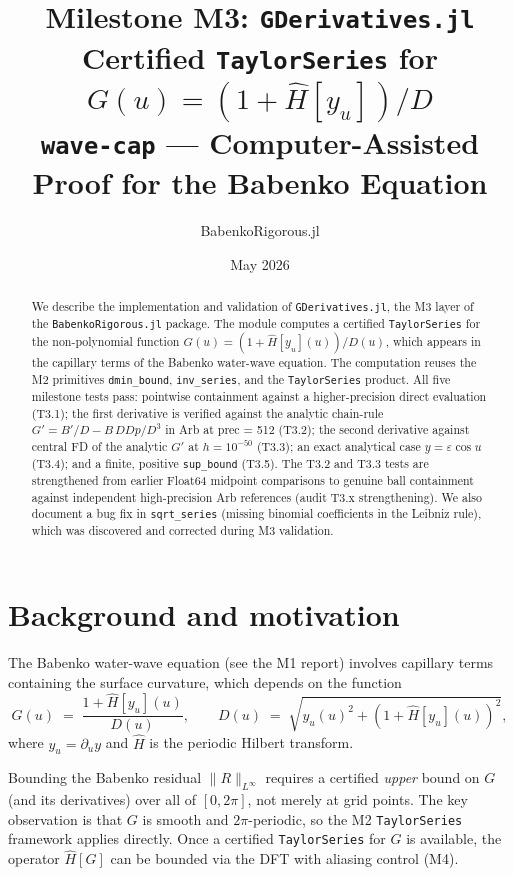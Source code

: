 \documentclass[11pt]{article}
\title{\textbf{Milestone M3: \texttt{GDerivatives.jl}}\\[0.4em]
\large Certified \texttt{TaylorSeries} for $G(u) = (1+\hat{H}[y_u])/D$\\[0.2em]
\normalsize \texttt{wave-cap} --- Computer-Assisted Proof for the Babenko Equation}
\author{BabenkoRigorous.jl}
\date{May 2026}
\theoremstyle{definition}
\begin{document}
\maketitle

\begin{abstract}
We describe the implementation and validation of \texttt{GDerivatives.jl},
the M3 layer of the \texttt{BabenkoRigorous.jl} package.
The module computes a certified \texttt{TaylorSeries} for the non-polynomial
function $G(u) = (1+\hat H[y_u](u)) / D(u)$, which appears in the capillary
terms of the Babenko water-wave equation.
The computation reuses the M2 primitives \texttt{dmin\_bound}, \texttt{inv\_series},
and the \texttt{TaylorSeries} product.
All five milestone tests pass: pointwise containment against a higher-precision
direct evaluation (T3.1); the first derivative is verified against the analytic
chain-rule $G' = B'/D - B\,DDp/D^3$ in Arb at prec = 512 (T3.2); the second
derivative against central FD of the analytic $G'$ at $h = 10^{-50}$ (T3.3);
an exact analytical case $y = \varepsilon\cos u$ (T3.4); and a finite, positive
\texttt{sup\_bound} (T3.5). The T3.2 and T3.3 tests are strengthened from earlier
Float64 midpoint comparisons to genuine ball containment against independent
high-precision Arb references (audit T3.x strengthening).
We also document a bug fix in \texttt{sqrt\_series} (missing binomial coefficients
in the Leibniz rule), which was discovered and corrected during M3 validation.
\end{abstract}

\tableofcontents
\bigskip

\section{Background and motivation}

The Babenko water-wave equation (see the M1 report) involves capillary terms
containing the surface curvature, which depends on the function
\[
  G(u) \;=\; \frac{1 + \hat H[y_u](u)}{D(u)},
  \qquad
  D(u) \;=\; \sqrt{y_u(u)^2 + (1 + \hat H[y_u](u))^2},
\]
where $y_u = \partial_u y$ and $\hat H$ is the periodic Hilbert transform.

Bounding the Babenko residual $\|R\|_{L^\infty}$ requires a certified
\emph{upper} bound on $G$ (and its derivatives) over all of $[0,2\pi]$,
not merely at grid points.
The key observation is that $G$ is smooth and $2\pi$-periodic, so the M2
\texttt{TaylorSeries} framework applies directly.
Once a certified \texttt{TaylorSeries} for $G$ is available, the operator
$\hat H[G]$ can be bounded via the DFT with aliasing control (M4).
\end{document}
